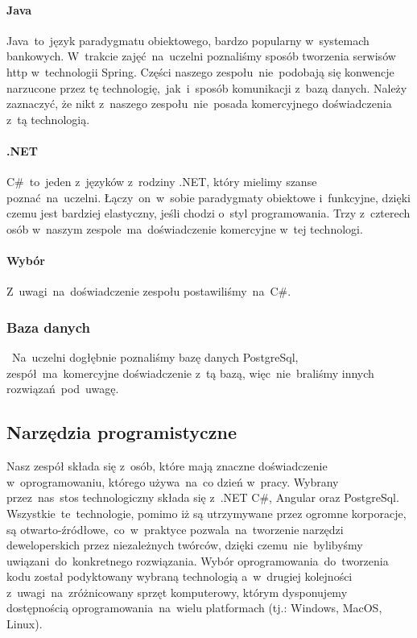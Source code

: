 \paragraph{Java}
Java~to~język paradygmatu obiektowego, bardzo popularny w~systemach bankowych.
W~trakcie zajęć~na~uczelni poznaliśmy sposób tworzenia serwisów \acrshort{http} w~technologii Spring.
Części naszego zespołu~nie~podobają się konwencje narzucone przez tę technologię,~jak~i~sposób komunikacji z~bazą danych.
Należy zaznaczyć, że nikt z~naszego zespołu~nie~posada komercyjnego doświadczenia z~tą technologią.

\paragraph{.NET}
C\#~to~jeden z~języków z~rodziny .NET, który mielimy szanse poznać~na~uczelni.
Łączy~on~w~sobie paradygmaty obiektowe i~funkcyjne, dzięki czemu jest bardziej elastyczny, jeśli chodzi o~styl programowania.
Trzy z~czterech osób w~naszym zespole~ma~doświadczenie komercyjne w~tej technologi.

\paragraph{Wybór}
Z~uwagi~na~doświadczenie zespołu postawiliśmy~na~C\#.

\subsubsection{Baza danych}~Na~uczelni dogłębnie poznaliśmy bazę danych PostgreSql, zespół~ma~komercyjne doświadczenie z~tą bazą, więc~nie~braliśmy innych rozwiązań~pod~uwagę.

\subsection{Narzędzia programistyczne}
\label{subsec:narzedzia-programistyczne}
Nasz zespół składa się z~osób, które mają znaczne doświadczenie w~oprogramowaniu, którego używa~na~co dzień w~pracy.
Wybrany przez~nas~stos technologiczny składa się z~.NET C\#, Angular oraz PostgreSql.
Wszystkie~te~technologie, pomimo iż są utrzymywane przez ogromne korporacje, są otwarto-źródłowe,~co~w~praktyce pozwala~na~tworzenie narzędzi deweloperskich przez niezależnych twórców, dzięki czemu~nie~bylibyśmy uwiązani~do~konkretnego rozwiązania.
Wybór oprogramowania~do~tworzenia kodu został podyktowany wybraną technologią a~w~drugiej kolejności z~uwagi~na~zróżnicowany sprzęt komputerowy, którym dysponujemy  dostępnością oprogramowania~na~wielu platformach (tj.: Windows, MacOS, Linux).


